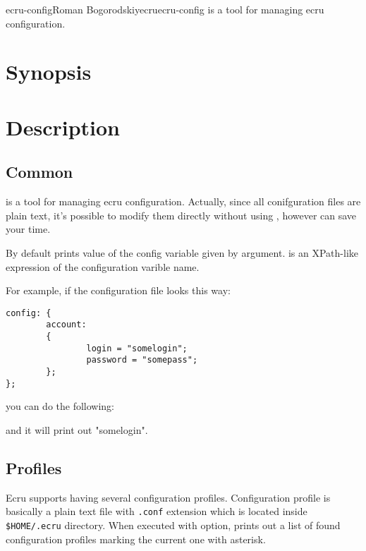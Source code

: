 \documentclass[english]{article}
\begin{document}
\begin{Name}{1}{ecru-config}{Roman Bogorodskiy}{ecru}{ecru-config}
	 is a tool for managing ecru configuration.
\end{Name}

\section{Synopsis}

 

  

 

 

\section{Description}
\subsection{Common}
 is a tool for managing ecru configuration. Actually, since
all conifguration files are plain text, it's possible to modify them directly
without using , however  can save  your
time.

By default  prints value of the config variable given by
 argument.  is an XPath-like 
expression of the configuration varible name.

For example, if the configuration file looks this way:

\begin{verbatim}
config: {
        account:
        {
                login = "somelogin";
                password = "somepass";
        };
};
\end{verbatim}

you can do the following:

 

and it will print out "somelogin".

\subsection{Profiles}
Ecru supports having several configuration profiles. Configuration profile
is basically a plain text file with \texttt{.conf} extension which is located
inside \texttt{\$HOME/.ecru} directory. When executed with  option,
 prints out a list of found configuration profiles marking
the current one with asterisk.
\end{document}
